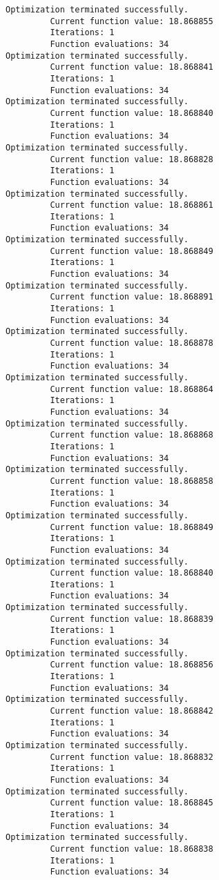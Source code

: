 \documentclass[11pt]{article}
\begin{document}
\begin{Verbatim}[commandchars=\\\{\}]
Optimization terminated successfully.
         Current function value: 18.868855
         Iterations: 1
         Function evaluations: 34
Optimization terminated successfully.
         Current function value: 18.868841
         Iterations: 1
         Function evaluations: 34
Optimization terminated successfully.
         Current function value: 18.868840
         Iterations: 1
         Function evaluations: 34
Optimization terminated successfully.
         Current function value: 18.868828
         Iterations: 1
         Function evaluations: 34
Optimization terminated successfully.
         Current function value: 18.868861
         Iterations: 1
         Function evaluations: 34
Optimization terminated successfully.
         Current function value: 18.868849
         Iterations: 1
         Function evaluations: 34
Optimization terminated successfully.
         Current function value: 18.868891
         Iterations: 1
         Function evaluations: 34
Optimization terminated successfully.
         Current function value: 18.868878
         Iterations: 1
         Function evaluations: 34
Optimization terminated successfully.
         Current function value: 18.868864
         Iterations: 1
         Function evaluations: 34
Optimization terminated successfully.
         Current function value: 18.868868
         Iterations: 1
         Function evaluations: 34
Optimization terminated successfully.
         Current function value: 18.868858
         Iterations: 1
         Function evaluations: 34
Optimization terminated successfully.
         Current function value: 18.868849
         Iterations: 1
         Function evaluations: 34
Optimization terminated successfully.
         Current function value: 18.868840
         Iterations: 1
         Function evaluations: 34
Optimization terminated successfully.
         Current function value: 18.868839
         Iterations: 1
         Function evaluations: 34
Optimization terminated successfully.
         Current function value: 18.868856
         Iterations: 1
         Function evaluations: 34
Optimization terminated successfully.
         Current function value: 18.868842
         Iterations: 1
         Function evaluations: 34
Optimization terminated successfully.
         Current function value: 18.868832
         Iterations: 1
         Function evaluations: 34
Optimization terminated successfully.
         Current function value: 18.868845
         Iterations: 1
         Function evaluations: 34
Optimization terminated successfully.
         Current function value: 18.868838
         Iterations: 1
         Function evaluations: 34

\end{Verbatim}
\end{document}
